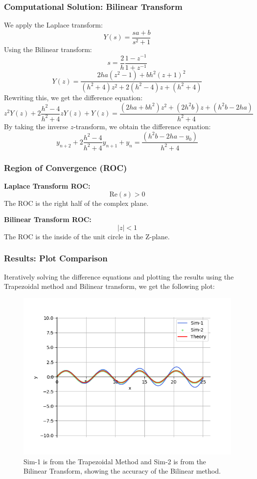 \documentclass{beamer}
\begin{document}
\begin{frame}
\frametitle{Computational Solution: Bilinear Transform}
We apply the Laplace transform:
\[
Y(s) = \frac{sa + b}{s^2 + 1}
\]
Using the Bilinear transform:
\[
s = \frac{2}{h} \frac{1 - z^{-1}}{1 + z^{-1}}
\]
\[
Y(z) = \frac{2 h a (z^2 - 1) + b h^2 (z + 1)^2}{(h^2 + 4) z^2 + 2 (h^2 - 4) z + (h^2 + 4)}
\]
Rewriting this, we get the difference equation:
\[
\boxed{
z^2 Y(z) + 2 \frac{h^2 - 4}{h^2 + 4} z Y(z) + Y(z) = \frac{(2 h a + b h^2) z^2 + (2 h^2 b) z + (h^2 b - 2 h a)}{h^2 + 4}
}
\]
By taking the inverse \( z \)-transform, we obtain the difference equation:
\[
\boxed{
y_{n + 2} + 2 \frac{h^2 - 4}{h^2 + 4} y_{n + 1} + y_n = \frac{(h^2 b - 2 h a - y_0)}{h^2 + 4}
}
\]
\end{frame}

\begin{frame}
\frametitle{Region of Convergence (ROC)}

\begin{block}{\textbf{Laplace Transform ROC:}}
\[
\boxed{\text{Re}(s) > 0}
\]
The ROC is the right half of the complex plane.

\end{block}

\vspace{0.5cm}

\begin{block}{\textbf{Bilinear Transform ROC:}}
\[
\boxed{|z| < 1}
\]
The ROC is the inside of the unit circle in the Z-plane.
\end{block}

\end{frame}

\begin{frame}
\frametitle{Results: Plot Comparison}
Iteratively solving the difference equations and plotting the results using the Trapezoidal method and Bilinear transform, we get the following plot:

\begin{figure}[h!]
    \centering
    \includegraphics[width=0.7\columnwidth]{figs/graph.png}
    \caption{Sim-1 is from the Trapezoidal Method and Sim-2 is from the Bilinear Transform, showing the accuracy of the Bilinear method.}
\end{figure}

\end{frame}
\end{document}
